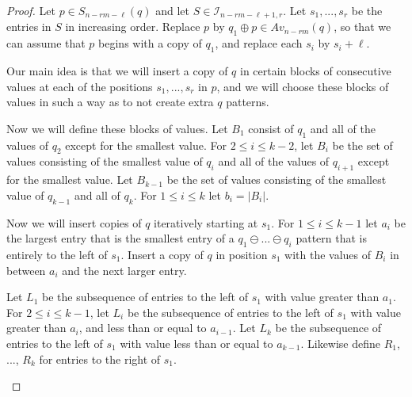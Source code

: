 \documentclass[10pt,a4paper]{amsart}
\begin{document}
\begin{proof}
    Let $p\in S_{n - rm - \ell }(q)$ and let $S \in \mathcal{I}_{n-rm-\ell+1, r}$. Let $s_1, ..., s_{r}$ be the entries in $S$ in increasing order. Replace $p$ by $q_1 \oplus p \in Av_{n - rm}(q)$, so that we can assume that $p$ begins with a copy of $q_1$, and replace each $s_i$ by $s_i + \ell$.
    
    Our main idea is that we will insert a copy of $q$ in certain blocks of consecutive values at each of the positions $s_1, ..., s_{r}$ in $p$, and we will choose these blocks of values in such a way as to not create extra $q$ patterns.

    Now we will define these blocks of values. Let $B_1$ consist of $q_1$ and all of the values of $q_2$ except for the smallest value. For $2\leq i \leq k-2$, let $B_i$ be the set of values consisting of the smallest value of $q_i$ and all of the values of $q_{i+1}$ except for the smallest value. Let $B_{k-1}$ be the set of values consisting of the smallest value of $q_{k-1}$ and all of $q_k$. For $1 \leq i \leq k$ let $b_i = |B_i|$. 
    

    Now we will insert copies of $q$ iteratively starting at $s_1$. For $1\leq i \leq k-1$ let $a_i$ be the largest entry that is the smallest entry of a $q_1 \ominus ... \ominus q_i$ pattern that is entirely to the left of $s_1$. Insert a copy of $q$ in position $s_1$ with the values of $B_i$ in between $a_i$ and the next larger entry.

    Let $L_1$ be the subsequence of entries to the left of $s_1$ with value greater than $a_1$. For $2\leq i \leq k-1$, let $L_i$ be the subsequence of entries to the left of $s_1$ with value greater than $a_i$, and less than or equal to $a_{i-1}$. Let $L_{k}$ be the subsequence of entries to the left of $s_1$ with value less than or equal to $a_{k-1}$. Likewise define $R_1$, ..., $R_k$ for entries to the right of $s_1$.

    \begin{figure}[H]
        \centering
\end{figure}
\end{proof}
\end{document}
